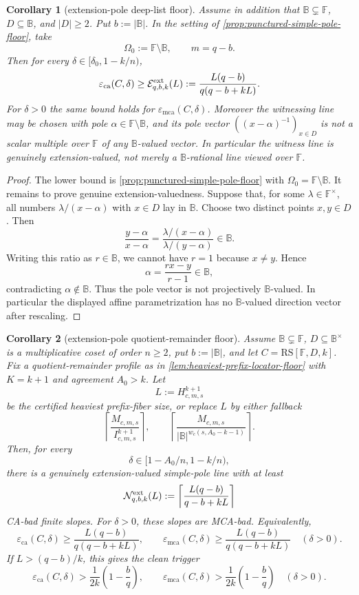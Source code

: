 \documentclass[11pt]{article}
\newtheorem{corollary}[corollary]{Corollary}
\theoremstyle{definition}
\theoremstyle{remark}
\newcommand{\F}{\mathbb{F}}
\newcommand{\B}{\mathbb{B}}
\newcommand{\RS}{\mathrm{RS}}
\newcommand{\eca}{\varepsilon_{\mathrm{ca}}}
\newcommand{\emca}{\varepsilon_{\mathrm{mca}}}
\begin{document}
\begin{corollary}[extension-pole deep-list floor]
\label{cor:extension-pole-deep-list-floor}
Assume in addition that $\B\subsetneq\F$, $D\subseteq\B$, and $|D|\ge2$.  Put
$b:=|\B|$.  In the setting of
\cref{prop:punctured-simple-pole-floor}, take
\[
        \Omega_0:=\F\setminus\B,
        \qquad m=q-b .
\]
Then for every $\delta\in[\delta_0,1-k/n)$,
\[
        \eca(C,\delta)
        \ge
        \mathcal E^{\rm ext}_{q,b,k}(L)
        :=
        \frac{L(q-b)}{q(q-b+kL)} .
\]
For $\delta>0$ the same bound holds for $\emca(C,\delta)$.  Moreover the
witnessing line may be chosen with pole $\alpha\in\F\setminus\B$, and its pole
vector $((x-\alpha)^{-1})_{x\in D}$ is not a scalar multiple over $\F$ of any
$\B$-valued vector.  In particular the witness line is genuinely
extension-valued, not merely a $\B$-rational line viewed over $\F$.
\end{corollary}

\begin{proof}
The lower bound is \cref{prop:punctured-simple-pole-floor} with
$\Omega_0=\F\setminus\B$.  It remains to prove genuine extension-valuedness.
Suppose that, for some $\lambda\in\F^\times$, all numbers
$\lambda/(x-\alpha)$ with $x\in D$ lay in $\B$.  Choose two distinct points
$x,y\in D$.  Then
\[
        \frac{y-\alpha}{x-\alpha}
        =
        \frac{\lambda/(x-\alpha)}{\lambda/(y-\alpha)}
        \in \B .
\]
Writing this ratio as $r\in\B$, we cannot have $r=1$ because $x\ne y$.  Hence
\[
        \alpha=\frac{rx-y}{r-1}\in\B,
\]
contradicting $\alpha\notin\B$.  Thus the pole vector is not projectively
$\B$-valued.  In particular the displayed affine parametrization has no
$\B$-valued direction vector after rescaling.
\end{proof}

\begin{corollary}[extension-pole quotient-remainder floor]
\label{cor:extension-pole-quotient-remainder-floor}
Assume $\B\subsetneq\F$, $D\subseteq\B^\times$ is a multiplicative coset of order
$n\ge2$, put $b:=|\B|$, and let $C=\RS[\F,D,k]$.
Fix a quotient-remainder profile as in
\cref{lem:heaviest-prefix-locator-floor} with $K=k+1$ and agreement $A_0>k$.
Let
\[
        L:=H_{c,m,s}^{k+1}
\]
be the certified heaviest prefix-fiber size, or replace $L$ by either fallback
\[
        \left\lceil \frac{M_{c,m,s}}{I_{c,m,s}^{k+1}}\right\rceil,
        \qquad
        \left\lceil\frac{M_{c,m,s}}{|\B|^{w_c(s,A_0-k-1)}}\right\rceil .
\]
Then, for every
\[
        \delta\in[1-A_0/n,1-k/n),
\]
there is a genuinely extension-valued simple-pole line with at least
\[
        \mathcal N^{\rm ext}_{q,b,k}(L)
        :=
        \left\lceil\frac{L(q-b)}{q-b+kL}\right\rceil
\]
CA-bad finite slopes.  For $\delta>0$, these slopes are MCA-bad.  Equivalently,
\[
        \eca(C,\delta)
        \ge
        \frac{L(q-b)}{q(q-b+kL)},
        \qquad
        \emca(C,\delta)
        \ge
        \frac{L(q-b)}{q(q-b+kL)}
        \quad(\delta>0).
\]
If $L>(q-b)/k$, this gives the clean trigger
\[
        \eca(C,\delta)>
        \frac1{2k}\left(1-\frac bq\right),
        \qquad
        \emca(C,\delta)>
        \frac1{2k}\left(1-\frac bq\right)
        \quad(\delta>0).
\]
\end{corollary}
\end{document}
